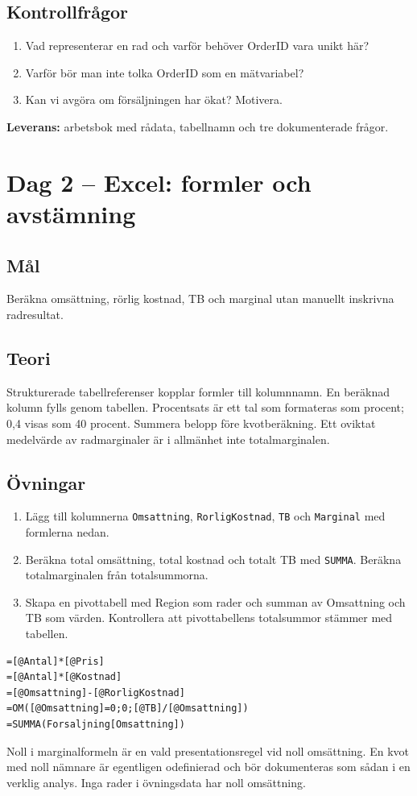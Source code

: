 \documentclass[11pt,a4paper]{article}
\newcommand{\dag}[2]{\clearpage\section{Dag #1 -- #2}}
\begin{document}
\subsection*{Kontrollfrågor}
\begin{enumerate}
\item Vad representerar en rad och varför behöver OrderID vara unikt här?
\item Varför bör man inte tolka OrderID som en mätvariabel?
\item Kan vi avgöra om försäljningen har ökat? Motivera.
\end{enumerate}
\textbf{Leverans:} arbetsbok med rådata, tabellnamn och tre dokumenterade frågor.

\dag{2}{Excel: formler och avstämning}
\subsection*{Mål}
Beräkna omsättning, rörlig kostnad, TB och marginal utan manuellt inskrivna radresultat.
\subsection*{Teori}
Strukturerade tabellreferenser kopplar formler till kolumnnamn. En beräknad kolumn fylls genom tabellen. Procentsats är ett tal som formateras som procent; 0,4 visas som 40 procent. Summera belopp före kvotberäkning. Ett oviktat medelvärde av radmarginaler är i allmänhet inte totalmarginalen.
\subsection*{Övningar}
\begin{enumerate}
\item Lägg till kolumnerna \texttt{Omsattning}, \texttt{RorligKostnad}, \texttt{TB} och \texttt{Marginal} med formlerna nedan.
\item Beräkna total omsättning, total kostnad och totalt TB med \texttt{SUMMA}. Beräkna totalmarginalen från totalsummorna.
\item Skapa en pivottabell med Region som rader och summan av Omsattning och TB som värden. Kontrollera att pivottabellens totalsummor stämmer med tabellen.
\end{enumerate}
\begin{lstlisting}
=[@Antal]*[@Pris]
=[@Antal]*[@Kostnad]
=[@Omsattning]-[@RorligKostnad]
=OM([@Omsattning]=0;0;[@TB]/[@Omsattning])
=SUMMA(Forsaljning[Omsattning])
\end{lstlisting}
Noll i marginalformeln är en vald presentationsregel vid noll omsättning. En kvot med noll nämnare är egentligen odefinierad och bör dokumenteras som sådan i en verklig analys. Inga rader i övningsdata har noll omsättning.
\end{document}
